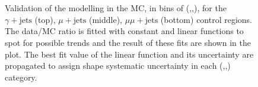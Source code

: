 \clearpage
\begin{figure}[tbhp]
    \caption{ 
    Validation of the \mht modelling in the MC, in bins of (\nj,\nb,\scalht), for the $\gamma+\mathrm{jets}$ (top), $\mu+\mathrm{jets}$ (middle),             
    $\mu\mu+\mathrm{jets}$ (bottom) control regions. The data/MC ratio is fitted with constant and linear functions to spot for possible 
    trends and the result of these fits are shown in the plot. The best fit value of the linear function and its uncertainty are propagated 
    to assign shape systematic uncertainty in each (\nj,\nb,\scalht) category. 
    \label{fig:mht-validation} }
  \begin{center}
     ~~
     \\
     ~~

\end{center}
\end{figure}
